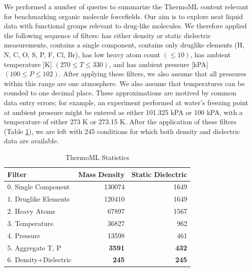 \documentclass[journal=jacsat,manuscript=article]{achemso}
\begin{document}
We performed a number of queries to summarize the ThermoML content relevant for benchmarking organic molecule forcefields.  Our aim is to explore neat liquid data with functional groups relevant to drug-like molecules.  We therefore applied the following sequence of filters: has either density or static dielectric measurements, contains a single component, contains only druglike elements (H, N, C, O, S, P, F, Cl, Br), has low heavy atom count $(\le 10)$, has ambient temperature [K] $(270 \le T \le 330)$, and has ambient pressure [kPA] $(100 \le P \le 102)$.  After applying these filters, we also assume that all pressures within this range are one atmosphere.  We also assume that temperatures can be rounded to one decimal place.  These approximations are motived by common data entry errors; for example, an experiment performed at water's freezing point at ambient pressure might be entered as either 101.325 kPA or 100 kPA, with a temperature of either 273 K or 273.15 K.  After the application of these filters (Table \ref{table:ThermoMLSummary}), we are left with 245 conditions for which both density and dielectric data are available.  

\begin{table}
\begin{tabular}{lrr}
\toprule
Filter &  Mass Density &  Static Dielectric \\
\midrule
0.  Single Component   &               130074 &                                     1649 \\
1.  Druglike Elements  &               120410 &                                     1649 \\
2.  Heavy Atoms        &                67897 &                                     1567 \\
3.  Temperature        &                36827 &                                      962 \\
4.  Pressure           &                13598 &                                      461 \\
5.  Aggregate T, P     &            \bf{3591} &                                 \bf{432} \\
6.  Density+Dielectric &             \bf{245} &                                 \bf{245} \\
\bottomrule
\end{tabular}
\caption{ThermoML Statistics}
\label{table:ThermoMLSummary}
\end{table}

\end{document}
